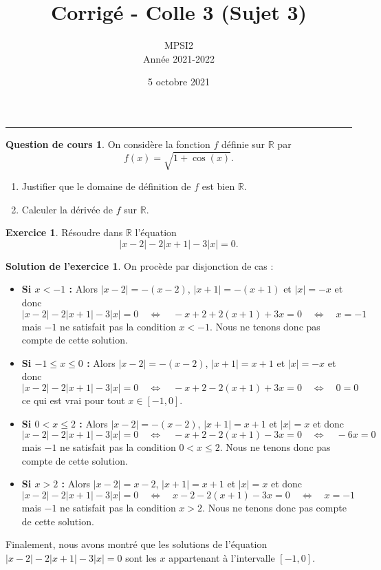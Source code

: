 \documentclass[a4paper, 11pt,openany]{article}%
\title{Corrigé - Colle 3 (Sujet 3)}
\author{MPSI2\\
Année 2021-2022}
\date{5 octobre 2021}
\theoremstyle{plain}
\theoremstyle{definition}
\newtheorem{cours}{Question de cours}
\newtheorem{exo}{Exercice}
\newtheorem{sol}{Solution de l'exercice}
\theoremstyle{remark}
\newcommand{\R}{\mathbb{R}}
\begin{document}
   \maketitle
      \rule{\linewidth}{0.5mm}

\begin{cours}
On considère la fonction $f$ définie sur $\R$ par
\[ f(x) = \sqrt{1+\cos(x)}.\]
\begin{enumerate}
\item Justifier que le domaine de définition de $f$ est bien $\R$.
\item Calculer la dérivée de $f$ sur $\R$.
\end{enumerate}
\end{cours}

\begin{exo}
Résoudre dans $\R$ l'équation
\[ |x-2| - 2 |x+1| -3|x| = 0.\]
\end{exo}

\begin{sol}
On procède par disjonction de cas :
\begin{itemize}
\item \textbf{Si $x < -1$ :} Alors $|x-2| = -(x-2)$, $|x+1| = -(x+1)$ et $|x| = -x$ et donc 
\[|x-2| - 2 |x+1| -3|x| = 0  \quad \Leftrightarrow \quad
-x+2 + 2 (x+1)+3x = 0 \quad \Leftrightarrow \quad
x=-1 \]
mais $-1$ ne satisfait pas la condition $x < -1$. Nous ne tenons donc pas compte de cette solution.
\item \textbf{Si $-1 \leqslant x \leqslant 0$ :} Alors $|x-2| = -(x-2)$, $|x+1| = x+1$ et $|x| = -x$ et donc 
\[|x-2| - 2 |x+1| -3|x| = 0  \quad \Leftrightarrow \quad
-x+2 - 2 (x+1)+3x = 0 \quad \Leftrightarrow \quad
0=0 \]
ce qui est vrai pour tout $x \in [-1,0]$.
\item \textbf{Si $0 <  x \leqslant 2$ :} Alors $|x-2| = -(x-2)$, $|x+1| = x+1$ et $|x| = x$ et donc 
\[|x-2| - 2 |x+1| -3|x| = 0  \quad \Leftrightarrow \quad
-x+2 - 2 (x+1)-3x = 0 \quad \Leftrightarrow \quad
-6x=0 \]
mais $-1$ ne satisfait pas la condition $0 <  x \leqslant 2$. Nous ne tenons donc pas compte de cette solution.
\item \textbf{Si $x > 2$ :} Alors $|x-2| = x-2$, $|x+1| = x+1$ et $|x| = x$ et donc 
\[|x-2| - 2 |x+1| -3|x| = 0  \quad \Leftrightarrow \quad
x-2 - 2 (x+1)-3x = 0 \quad \Leftrightarrow \quad
x=-1 \]
mais $-1$ ne satisfait pas la condition $x > 2$. Nous ne tenons donc pas compte de cette solution.
\end{itemize}
Finalement, nous avons montré que les solutions de l'équation $|x-2| - 2 |x+1| -3|x| = 0$ sont les $ x$ appartenant à l'intervalle $[-1,0]$.
\end{sol}
\end{document}
